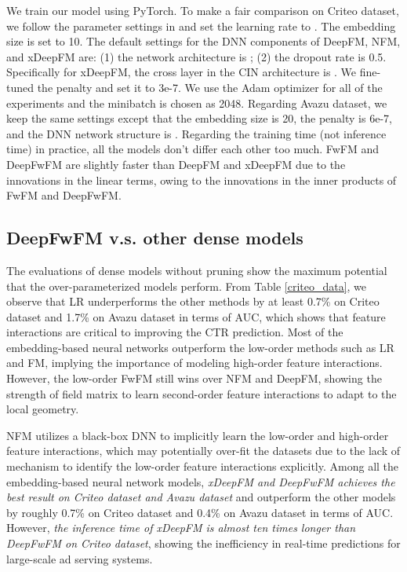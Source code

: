 \documentclass[sigconf]{acmart}
\begin{document}
We train our model using PyTorch. To make a fair comparison on Criteo dataset, we follow the parameter settings in \cite{deepfm, xdeepfm} and set the learning rate to . The embedding size is set to 10. The default settings for the DNN components of DeepFM, NFM, and xDeepFM are: (1) the network architecture is ; (2) the dropout rate is 0.5. Specifically for xDeepFM, the cross layer in the CIN architecture is . We fine-tuned the  penalty and set it to 3e-7. We use the Adam optimizer \cite{adam} for all of the experiments and the minibatch is chosen as 2048. Regarding Avazu dataset, we keep the same settings except that the embedding size is 20, the  penalty is 6e-7, and the DNN network structure is . Regarding the training time (not inference time) in practice, all the models don't differ each other too much. FwFM and DeepFwFM are slightly faster than DeepFM and xDeepFM due to the innovations in the linear terms, owing to the innovations in the inner products of FwFM and DeepFwFM.



\subsection{DeepFwFM v.s. other dense models}
\label{dense_model}

The evaluations of dense models without pruning show the maximum potential that the over-parameterized models perform. From Table \ref{criteo_data}, we observe that LR underperforms the other methods by at least 0.7\% on Criteo dataset and 1.7\% on Avazu dataset in terms of AUC, which shows that feature interactions are critical to improving the CTR prediction. Most of the embedding-based neural networks outperform the low-order methods such as LR and FM, implying the importance of modeling high-order feature interactions. However, the low-order FwFM still wins over NFM and DeepFM, showing the strength of field matrix  to learn second-order feature interactions to adapt to the local geometry. 

NFM utilizes a black-box DNN to implicitly learn the low-order and high-order feature interactions, which may potentially over-fit the datasets due to the lack of mechanism to identify the low-order feature interactions explicitly. Among all the embedding-based neural network models, \emph{xDeepFM and DeepFwFM achieves the best result on Criteo dataset and Avazu dataset} and outperform the other models by roughly 0.7\% on Criteo dataset and 0.4\% on Avazu dataset in terms of AUC. However, \emph{the inference time of xDeepFM is almost ten times longer than DeepFwFM on Criteo dataset}, showing the inefficiency in real-time predictions for large-scale ad serving systems. 
\end{document}
